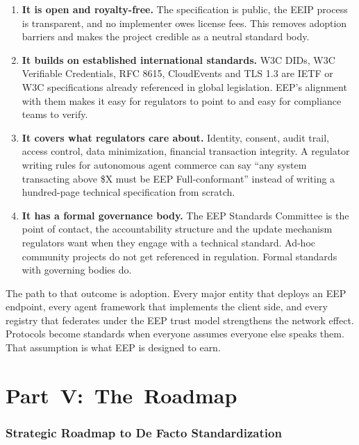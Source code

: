 \documentclass[12pt,a4paper]{article}
\begin{document}
\begin{enumerate}
    \item \textbf{It is open and royalty-free.} The specification is public, the EEIP process is transparent, and no implementer owes license fees. This removes adoption barriers and makes the project credible as a neutral standard body.
    \item \textbf{It builds on established international standards.} W3C DIDs, W3C Verifiable Credentials, RFC 8615, CloudEvents and TLS 1.3 are IETF or W3C specifications already referenced in global legislation. EEP's alignment with them makes it easy for regulators to point to and easy for compliance teams to verify.
    \item \textbf{It covers what regulators care about.} Identity, consent, audit trail, access control, data minimization, financial transaction integrity. A regulator writing rules for autonomous agent commerce can say ``any system transacting above \$X must be EEP Full-conformant'' instead of writing a hundred-page technical specification from scratch.
    \item \textbf{It has a formal governance body.} The EEP Standards Committee is the point of contact, the accountability structure and the update mechanism regulators want when they engage with a technical standard. Ad-hoc community projects do not get referenced in regulation. Formal standards with governing bodies do.
\end{enumerate}

The path to that outcome is adoption. Every major entity that deploys an EEP endpoint, every agent framework that implements the client side, and every registry that federates under the EEP trust model strengthens the network effect. Protocols become standards when everyone assumes everyone else speaks them. That assumption is what EEP is designed to earn.


\part*{Part~V:~The~Roadmap}
\section{Strategic Roadmap to De Facto Standardization}
\end{document}
